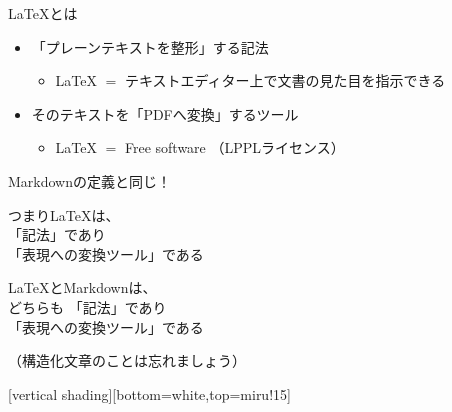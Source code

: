 \documentclass[14pt,dvipdfmx,uplatex]{beamer}
\begin{document}
\begin{frame}[t]{\inhibitglue \LaTeX{}とは}
  \sffamily
    \begin{itemize}
      \item \leavevmode\inhibitglue 「プレーンテキストを整形」する記法 \\
        \begin{itemize}
          \item \LaTeX{} $=$ テキストエディター上で文書の見た目を指示できる\\[3ex]
        \end{itemize} 
      \item そのテキストを「PDFへ変換」するツール
        \begin{itemize}
          \item \LaTeX{} $=$ Free software （LPPLライセンス）
        \end{itemize}
    \end{itemize}
    \vfill

    \begin{center}\footnotesize\sffamily
    Markdownの定義と同じ！
    \end{center}
\end{frame}

\begin{frame}[plain]
  \begin{center}
    \color{kachi}\yasagoth
    つまり\LaTeX{}は、\\
    \leavevmode\inhibitglue 「記法」であり\\ 
    \leavevmode\inhibitglue 「表現への変換ツール」である
  \end{center}
\end{frame}

\begin{frame}[plain]
  \begin{center}
    \color{kachi}\yasagoth
    \LaTeX{}とMarkdownは、\\
    どちらも
    \leavevmode\inhibitglue 「記法」であり\\ 
    \leavevmode\inhibitglue 「表現への変換ツール」である
  \end{center}
    \vfill

    \begin{center}\footnotesize\sffamily
      （構造化文章のことは忘れましょう）
    \end{center}
\end{frame}

[vertical shading][bottom=white,top=miru!15]
\end{document}
